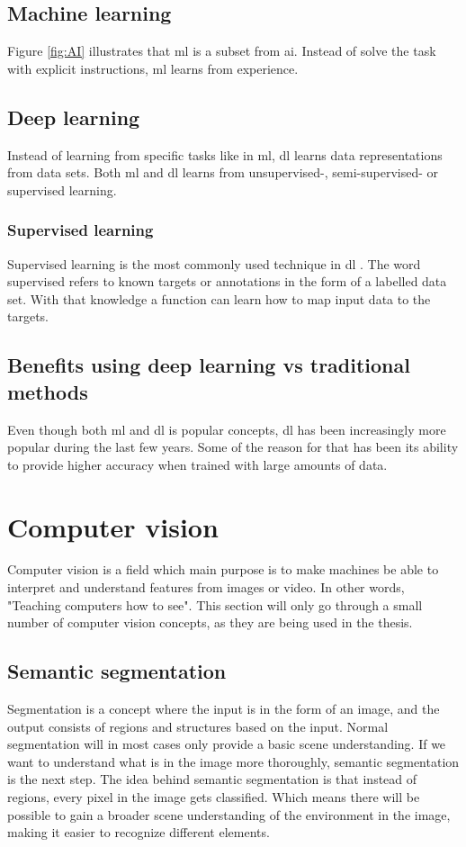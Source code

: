 \documentclass[USenglish]{ifimaster}  %
\begin{document}
\subsection{Machine learning}
Figure \ref{fig:AI} illustrates that \ac{ml} is a subset from \ac{ai}. Instead of solve the task with explicit instructions, \ac{ml} learns from experience.
\subsection{Deep learning}
Instead of learning from specific tasks like in \ac{ml}, \ac{dl} learns data representations from data sets. Both \ac{ml} and \ac{dl} learns from unsupervised-, semi-supervised- or supervised learning. 
\subsubsection{Supervised learning}
Supervised learning is the most commonly used technique in \ac{dl} \cite{Francois_Deep_learning_with_python}. The word supervised refers to known targets or annotations in the form of a labelled data set. With that knowledge a function can learn how to map input data to the targets. 
\subsection{Benefits using deep learning vs traditional methods}
Even though both \ac{ml} and \ac{dl} is popular concepts, \ac{dl} has been increasingly more popular during the last few years. Some of the reason for that has been its ability to provide higher accuracy when trained with large amounts of data.       
\section{Computer vision}
Computer vision is a field which main purpose is to make machines be able to interpret and understand features from images or video. In other words, "Teaching computers how to see"\cite{website:maskinsyn-intro}. This section will only go through a small number of computer vision concepts, as they are being used in the thesis.
\subsection{Semantic segmentation}
Segmentation is a concept where the input is in the form of an image, and the output consists of regions and structures based on the input. Normal segmentation will in most cases only provide a basic scene understanding. If we want to understand what is in the image more thoroughly, semantic segmentation is the next step. The idea behind semantic segmentation is that instead of regions, every pixel in the image gets classified. Which means there will be possible to gain a broader scene understanding of the environment in the image, making it easier to recognize different elements. 
\end{document}
